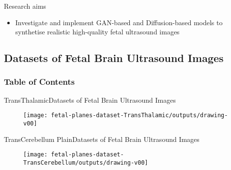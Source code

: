 {
\begin{frame}{Research aims}

\bigSizeFont
\begin{itemize}
\item Investigate and implement GAN-based and Diffusion-based models to synthetise realistic high-quality fetal ultrasound images
\end{itemize}

\end{frame}
}


\subsection{Datasets of Fetal Brain Ultrasound Images}
\begin{frame}
  \frametitle{Table of Contents}
  \tableofcontents[currentsubsection]
\end{frame}


{

\begin{frame}{TransThalamic}{Datasets of Fetal Brain Ultrasound Images}
      \begin{figure}
        \centering
        \texttt{[image: fetal-planes-dataset-TransThalamic/outputs/drawing-v00]}
      \end{figure}
\end{frame}
}

{

\begin{frame}{TransCerebellum Plain}{Datasets of Fetal Brain Ultrasound Images}
      \begin{figure}
        \centering
        \texttt{[image: fetal-planes-dataset-TransCerebellum/outputs/drawing-v00]}
      \end{figure}
\end{frame}
}





